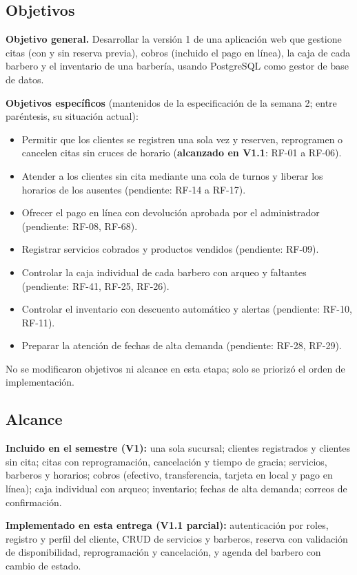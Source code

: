 \documentclass[12pt,a4paper,oneside]{article}
\begin{document}
\subsection{Objetivos}
\textbf{Objetivo general.} Desarrollar la versi\'on 1 de una aplicaci\'on web que gestione citas (con y sin reserva previa), cobros (incluido el pago en l\'inea), la caja de cada barbero y el inventario de una barber\'ia, usando PostgreSQL como gestor de base de datos.

\textbf{Objetivos espec\'ificos} (mantenidos de la especificaci\'on de la semana 2; entre par\'entesis, su situaci\'on actual):
\begin{itemize}[nosep]
\item Permitir que los clientes se registren una sola vez y reserven, reprogramen o cancelen citas sin cruces de horario (\textbf{alcanzado en V1.1}: RF-01 a RF-06).
\item Atender a los clientes sin cita mediante una cola de turnos y liberar los horarios de los ausentes (pendiente: RF-14 a RF-17).
\item Ofrecer el pago en l\'inea con devoluci\'on aprobada por el administrador (pendiente: RF-08, RF-68).
\item Registrar servicios cobrados y productos vendidos (pendiente: RF-09).
\item Controlar la caja individual de cada barbero con arqueo y faltantes (pendiente: RF-41, RF-25, RF-26).
\item Controlar el inventario con descuento autom\'atico y alertas (pendiente: RF-10, RF-11).
\item Preparar la atenci\'on de fechas de alta demanda (pendiente: RF-28, RF-29).
\end{itemize}
No se modificaron objetivos ni alcance en esta etapa; solo se prioriz\'o el orden de implementaci\'on.

\subsection{Alcance}
\textbf{Incluido en el semestre (V1):} una sola sucursal; clientes registrados y clientes sin cita; citas con reprogramaci\'on, cancelaci\'on y tiempo de gracia; servicios, barberos y horarios; cobros (efectivo, transferencia, tarjeta en local y pago en l\'inea); caja individual con arqueo; inventario; fechas de alta demanda; correos de confirmaci\'on.

\textbf{Implementado en esta entrega (V1.1 parcial):} autenticaci\'on por roles, registro y perfil del cliente, CRUD de servicios y barberos, reserva con validaci\'on de disponibilidad, reprogramaci\'on y cancelaci\'on, y agenda del barbero con cambio de estado.
\end{document}
